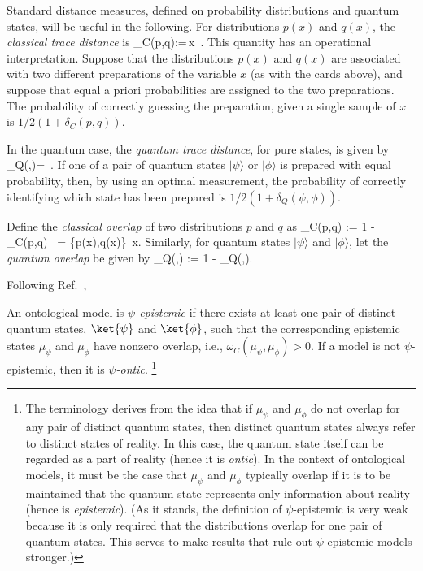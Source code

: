 Standard distance measures, defined on probability distributions and quantum states, will be useful in the following. For distributions $p(x)$ and $q(x)$, the \emph{classical trace distance} is
\be
\delta_C(p,q):=\int {}\,x \,.
\ee
This quantity has an operational interpretation. Suppose that the distributions $p(x)$ and $q(x)$ are associated with two different preparations of the variable $x$ (as with the cards above), and suppose that equal a priori probabilities are assigned to the two preparations.  The probability of correctly guessing the preparation, given a single sample of $x$ is $1/2(1+\delta_C(p,q))$. 

In the quantum case, the \emph{quantum trace distance}, for pure states, is given by
\be\label{eq:quantum_trace}
\delta_Q(\psi,\phi)= \,.
\ee
If one of a pair of quantum states $|\psi\rangle$ or $|\phi\rangle$ is prepared with equal probability, then, by using an optimal measurement, the probability of correctly identifying which state has been prepared is $1/2(1+\delta_Q(\psi,\phi))$. 

Define the {\it classical overlap} of two distributions $p$ and $q$ as
\be
\omega_C(p,q) := 1 - \delta_C(p,q) \, = \int \min \{p(x),q(x)\} \,x.
\ee
Similarly, for quantum states $|\psi\rangle$ and $|\phi\rangle$, let the \emph{quantum overlap} be given by
\be
\omega_Q(\psi,\phi) := 1 - \delta_Q(\psi,\phi).
\ee

Following Ref.~\cite{Harrigan2010}, 
\begin{dfn}
An ontological model is  \emph{$\psi$-epistemic} if there exists at least one pair of distinct quantum states, $\ket{\psi}$ and $\ket{\phi}$, such that the corresponding epistemic states $\mu_\psi$ and $\mu_\phi$ have nonzero overlap, i.e., $\omega_C(\mu_\psi,\mu_\phi) > 0$. If a model is not $\psi$-epistemic, then it is \emph{$\psi$-ontic}. \footnote{The terminology derives from the idea that if $\mu_\psi$ and $\mu_\phi$ do not overlap for any pair of distinct quantum states, then distinct quantum states always refer to distinct states of reality. In this case, the quantum state itself can be regarded as a part of reality (hence it is \emph{ontic}). In the context of ontological models, it must be the case that $\mu_\psi$ and $\mu_\phi$ typically overlap if it is to be maintained that the quantum state represents only information about reality (hence is \emph{epistemic}). (As it stands, the definition of $\psi$-epistemic is very weak because it is only required that the distributions overlap for one pair of quantum states. This serves to make results that rule out $\psi$-epistemic models stronger.)}
\end{dfn}

